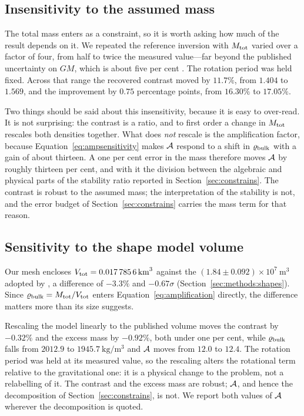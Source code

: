 \subsection{Insensitivity to the assumed mass}
\label{sec:itokawa:mass}

The total mass enters as a constraint, so it is worth asking how much of
the result depends on it. We repeated the reference inversion with
$M_{\mathrm{tot}}$ varied over a factor of four, from half to twice the measured
value---far beyond the published uncertainty on $GM$, which is about five
per cent \citep{abe2006}. The rotation period was held fixed. Across that
range the recovered contrast moved by $11.7\%$, from $1.404$ to $1.569$,
and the improvement by $0.75$ percentage points, from $16.30\%$ to
$17.05\%$.

Two things should be said about this insensitivity, because it is easy to
over-read. It is not surprising: the contrast is a ratio, and to first
order a change in $M_{\mathrm{tot}}$ rescales both densities together. What does
\emph{not} rescale is the amplification factor, because
Equation~\eqref{eq:ampsensitivity} makes $\mathcal{A}$ respond to a shift in
$\varrho_{\mathrm{bulk}}$ with a gain of about thirteen. A one per cent error in the
mass therefore moves $\mathcal{A}$ by roughly thirteen per cent, and with it
the division between the algebraic and physical parts of the stability
ratio reported in Section~\ref{sec:constrains}. The contrast is robust to
the assumed mass; the interpretation of the stability is not, and the
error budget of Section~\ref{sec:constrains} carries the mass term for
that reason.

\subsection{Sensitivity to the shape model volume}
\label{sec:itokawa:scale}

Our mesh encloses $V_{\mathrm{tot}} = \SI{0.0177856}{\cubic\kilo\metre}$ against the
$(1.84\pm0.092)\times10^{7}~\mathrm{m^{3}}$ adopted by \citet{abe2006}, a
difference of $-3.3\%$ and $-0.67\sigma$
(Section~\ref{sec:methods:shapes}). Since $\varrho_{\mathrm{bulk}} = M_{\mathrm{tot}}/V_{\mathrm{tot}}$
enters Equation~\eqref{eq:amplification} directly, the difference matters
more than its size suggests.

Rescaling the model linearly to the published volume moves the contrast
by $-0.32\%$ and the excess mass by $-0.92\%$, both under one per cent, while
$\varrho_{\mathrm{bulk}}$ falls from $2012.9$ to
$\SI{1945.7}{\kilo\gram\per\cubic\metre}$ and $\mathcal{A}$ moves from $12.0$
to $12.4$. The rotation period was held at its measured value, so the
rescaling alters the rotational term relative to the gravitational one: it
is a physical change to the problem, not a relabelling of it.
The contrast and the excess mass are robust; $\mathcal{A}$, and hence the
decomposition of Section~\ref{sec:constrains}, is not. We report both
values of $\mathcal{A}$ wherever the decomposition is quoted.

